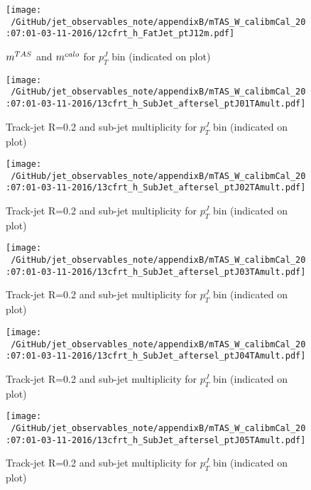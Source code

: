 \begin{figure}
 
\texttt{[image: ~/GitHub/jet\_observables\_note/appendixB/mTAS\_W\_calibmCal\_20:07:01-03-11-2016/12cfrt\_h\_FatJet\_ptJ12m.pdf]}
\caption{$m^{TAS}$ and $m^{calo}$ for $p_{T}^{J}$ bin (indicated on plot) }
 
\end{figure}
\clearpage %
\begin{figure}
 
\texttt{[image: ~/GitHub/jet\_observables\_note/appendixB/mTAS\_W\_calibmCal\_20:07:01-03-11-2016/13cfrt\_h\_SubJet\_aftersel\_ptJ01TAmult.pdf]}
\caption{Track-jet R=0.2 and sub-jet multiplicity for $p_{T}^{J}$ bin (indicated on plot) }
 
\end{figure}
 
\begin{figure}
 
\texttt{[image: ~/GitHub/jet\_observables\_note/appendixB/mTAS\_W\_calibmCal\_20:07:01-03-11-2016/13cfrt\_h\_SubJet\_aftersel\_ptJ02TAmult.pdf]}
\caption{Track-jet R=0.2 and sub-jet multiplicity for $p_{T}^{J}$ bin (indicated on plot) }
 
\end{figure}
 
\begin{figure}
 
\texttt{[image: ~/GitHub/jet\_observables\_note/appendixB/mTAS\_W\_calibmCal\_20:07:01-03-11-2016/13cfrt\_h\_SubJet\_aftersel\_ptJ03TAmult.pdf]}
\caption{Track-jet R=0.2 and sub-jet multiplicity for $p_{T}^{J}$ bin (indicated on plot) }
 
\end{figure}
 
\begin{figure}
 
\texttt{[image: ~/GitHub/jet\_observables\_note/appendixB/mTAS\_W\_calibmCal\_20:07:01-03-11-2016/13cfrt\_h\_SubJet\_aftersel\_ptJ04TAmult.pdf]}
\caption{Track-jet R=0.2 and sub-jet multiplicity for $p_{T}^{J}$ bin (indicated on plot) }
 
\end{figure}
 
\begin{figure}
 
\texttt{[image: ~/GitHub/jet\_observables\_note/appendixB/mTAS\_W\_calibmCal\_20:07:01-03-11-2016/13cfrt\_h\_SubJet\_aftersel\_ptJ05TAmult.pdf]}
\caption{Track-jet R=0.2 and sub-jet multiplicity for $p_{T}^{J}$ bin (indicated on plot) }
 
\end{figure}
 
